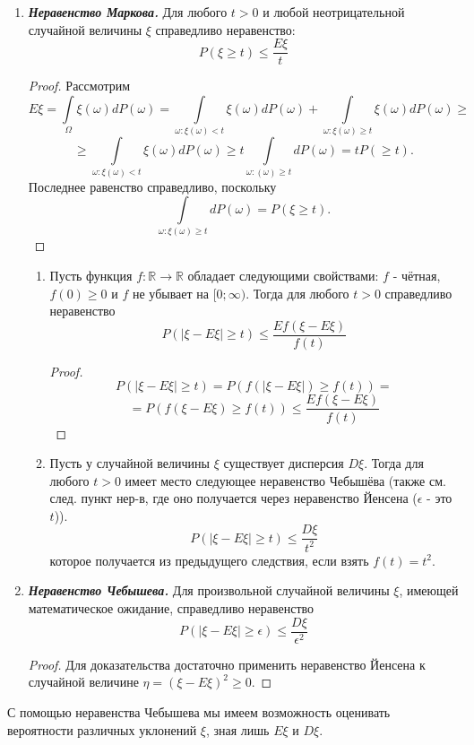 \begin{enumerate}
	\item \textit{\textbf{Неравенство Маркова.}} Для любого $t > 0$ и любой неотрицательной случайной величины $\xi$ справедливо неравенство:
	\[ P(\xi \ge t) \le \frac{E\xi}{t} \]
	\begin{proof}
		Рассмотрим
		\[ E\xi = \int\limits_{\Omega} \xi (\omega) d P(\omega) = \int\limits_{\omega : \xi (\omega) < t} \xi (\omega) d P(\omega) + \int\limits_{\omega : \xi (\omega) \ge t} \xi (\omega) d P(\omega) \ge \]
		\[ \ge \int\limits_{\omega : \xi (\omega) < t} \xi (\omega) d P(\omega) \ge t \int\limits_{\omega : (\omega) \ge t} d P (\omega) = t P(\ge t). \]
		Последнее равенство справедливо, поскольку
		\[ \int\limits_{\omega : \xi (\omega) \ge t} d P(\omega) = P (\xi \ge t). \]
	\end{proof}
	\begin{corollary}\leavevmode \vspace*{-\bigskipamount}\vspace*{-\medskipamount}
		\begin{enumerate}
			\item Пусть функция $f : \mathbb{R} \to \mathbb{R}$ обладает следующими свойствами: $f$ - чётная, $f(0) \ge 0$ и $f$ не убывает на $[0; \infty)$. Тогда для любого $t > 0$ справедливо неравенство
			\[ P ( |\xi - E\xi| \ge t ) \le \frac{E f(\xi - E \xi)}{f(t)} \]
			\begin{proof}
				\[ P ( |\xi - E \xi| \ge t ) = P ( f ( |\xi - E\xi| ) \ge f(t) ) = \]
				\[ = P ( f (\xi - E\xi) \ge f(t) ) \le \frac{Ef(\xi - E\xi)}{f(t)} \]
			\end{proof}
			\item Пусть у случайной величины $\xi$ существует дисперсия $D\xi$. Тогда для любого $t>0$ имеет место следующее неравенство Чебышёва (также см. след. пункт нер-в, где оно получается через неравенство Йенсена ($\epsilon$ - это $t$)).
			\[ P ( |\xi - E\xi| \ge t ) \le \frac{D\xi}{t^2} \]
			которое получается из предыдущего следствия, если взять $f(t) = t^2$.
		\end{enumerate}
	\end{corollary}
	\item \textit{\textbf{Неравенство Чебышева.}} Для произвольной случайной величины $\xi$, имеющей математическое ожидание, справедливо неравенство
	\[ P( |\xi - E\xi| \ge \epsilon ) \le \frac{D\xi}{\epsilon^2} \]
	\begin{proof}
		Для доказательства достаточно применить неравенство Йенсена к случайной величине $\eta = (\xi - E\xi)^2 \ge 0$.
	\end{proof}
\end{enumerate}
\begin{remark}
	С помощью неравенства Чебышева мы имеем возможность оценивать вероятности различных уклонений $\xi$, зная лишь $E\xi$ и $D\xi$.
\end{remark}

